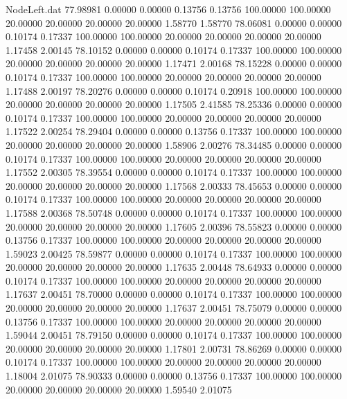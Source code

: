 \begin{filecontents}{NodeLeft.dat}
  77.98981    0.00000    0.00000     0.13756    0.13756  100.00000  100.00000   20.00000   20.00000   20.00000   20.00000    1.58770    1.58770
  78.06081    0.00000    0.00000     0.10174    0.17337  100.00000  100.00000   20.00000   20.00000   20.00000   20.00000    1.17458    2.00145
  78.10152    0.00000    0.00000     0.10174    0.17337  100.00000  100.00000   20.00000   20.00000   20.00000   20.00000    1.17471    2.00168
  78.15228    0.00000    0.00000     0.10174    0.17337  100.00000  100.00000   20.00000   20.00000   20.00000   20.00000    1.17488    2.00197
  78.20276    0.00000    0.00000     0.10174    0.20918  100.00000  100.00000   20.00000   20.00000   20.00000   20.00000    1.17505    2.41585
  78.25336    0.00000    0.00000     0.10174    0.17337  100.00000  100.00000   20.00000   20.00000   20.00000   20.00000    1.17522    2.00254
  78.29404    0.00000    0.00000     0.13756    0.17337  100.00000  100.00000   20.00000   20.00000   20.00000   20.00000    1.58906    2.00276
  78.34485    0.00000    0.00000     0.10174    0.17337  100.00000  100.00000   20.00000   20.00000   20.00000   20.00000    1.17552    2.00305
  78.39554    0.00000    0.00000     0.10174    0.17337  100.00000  100.00000   20.00000   20.00000   20.00000   20.00000    1.17568    2.00333
  78.45653    0.00000    0.00000     0.10174    0.17337  100.00000  100.00000   20.00000   20.00000   20.00000   20.00000    1.17588    2.00368
  78.50748    0.00000    0.00000     0.10174    0.17337  100.00000  100.00000   20.00000   20.00000   20.00000   20.00000    1.17605    2.00396
  78.55823    0.00000    0.00000     0.13756    0.17337  100.00000  100.00000   20.00000   20.00000   20.00000   20.00000    1.59023    2.00425
  78.59877    0.00000    0.00000     0.10174    0.17337  100.00000  100.00000   20.00000   20.00000   20.00000   20.00000    1.17635    2.00448
  78.64933    0.00000    0.00000     0.10174    0.17337  100.00000  100.00000   20.00000   20.00000   20.00000   20.00000    1.17637    2.00451
  78.70000    0.00000    0.00000     0.10174    0.17337  100.00000  100.00000   20.00000   20.00000   20.00000   20.00000    1.17637    2.00451
  78.75079    0.00000    0.00000     0.13756    0.17337  100.00000  100.00000   20.00000   20.00000   20.00000   20.00000    1.59044    2.00451
  78.79150    0.00000    0.00000     0.10174    0.17337  100.00000  100.00000   20.00000   20.00000   20.00000   20.00000    1.17801    2.00731
  78.86269    0.00000    0.00000     0.10174    0.17337  100.00000  100.00000   20.00000   20.00000   20.00000   20.00000    1.18004    2.01075
  78.90333    0.00000    0.00000     0.13756    0.17337  100.00000  100.00000   20.00000   20.00000   20.00000   20.00000    1.59540    2.01075

\end{filecontents}
